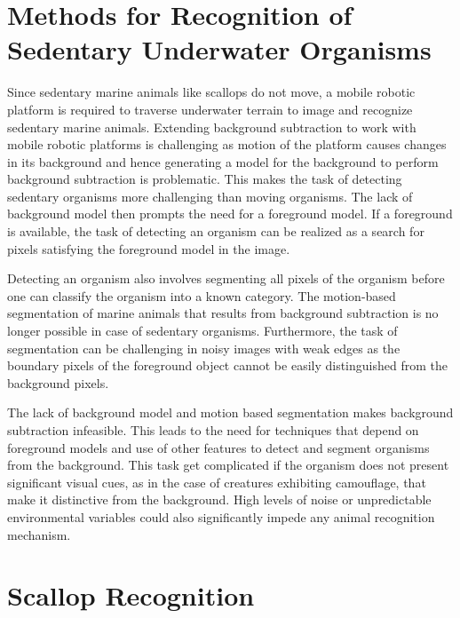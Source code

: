 \documentclass {udthesis}
\begin{document}

\section{Methods for Recognition of Sedentary Underwater Organisms}

Since sedentary marine animals like scallops do not move, a mobile robotic platform is required to traverse underwater terrain to image and recognize sedentary marine animals. Extending background subtraction to work with mobile robotic platforms is challenging as motion of the platform causes changes in its background and hence generating a model for the background to perform background subtraction is problematic. This makes the task of detecting sedentary organisms more challenging than moving organisms. The lack of background model then prompts the need for a foreground model. If a foreground is available, the task of detecting an organism can be realized as a search for pixels satisfying the foreground model in the image.

Detecting an organism also involves segmenting all pixels of the organism before one can classify the organism into a known category. 
The motion-based segmentation of marine animals that results from background subtraction is no longer possible in case of sedentary organisms. 
Furthermore, the task of segmentation can be challenging in noisy images with weak edges as the boundary pixels of the foreground object cannot be easily distinguished from the background pixels.

The lack of background model and motion based segmentation makes background subtraction infeasible. This leads to the need for techniques that depend on foreground models and use of other features to detect and segment organisms from the background. This task get complicated if the organism does not present significant visual cues, as in the case of creatures exhibiting camouflage, that make it distinctive from the background. High levels of noise or unpredictable environmental variables could also significantly impede any animal recognition mechanism.


\section{Scallop Recognition}
\end{document}
